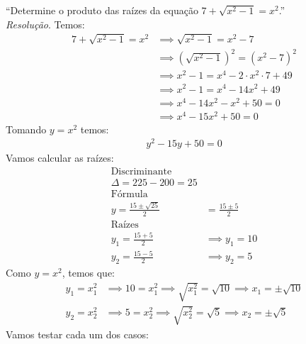 \enquote{Determine o produto das raízes da equação $7 + \sqrt{x^2 - 1} = x^2$.}
\\
\emph{Resolução}. Temos:
\begin{align*}
    7 + \sqrt{x^2 - 1} = x^2 & \implies \sqrt{x^2 - 1} = x^2 - 7 \\ & \implies
    (\sqrt{x^2 - 1})^2 = (x^2 - 7)^2 \\ & \implies
    x^2 - 1 = x^4 - 2\cdot x^2 \cdot 7 + 49 \\ & \implies 
    x^2 - 1 = x^4 - 14x^2 + 49 \\ & \implies
    x^4 - 14x^2 - x^2 + 50 = 0 \\ & \implies
    x^4 - 15x^2 + 50 = 0
\end{align*}
Tomando $y = x^2$ temos:
\begin{align*}
    y^2 - 15y + 50 = 0
\end{align*}
Vamos calcular as raízes:
\begin{align*}
    \text{Discriminante} \\
    \Delta = 225 - 200 = 25 
    \\ \text{Fórmula} \\
    y = \frac{15 \pm \sqrt{25}}{2} & =
    \frac{15 \pm 5}{2}
    \\ \text{Raízes} \\
    y_1 = \frac{15 + 5}{2} & \implies y_1 = 10 \\
    y_2 = \frac{15 - 5}{2} & \implies y_2 = 5
\end{align*}
Como $y = x^2$, temos que:
\begin{align*}
    y_1 = x_1^2 & \implies 10 = x_1^2 \implies \sqrt{x_1^2} = \sqrt{10} \implies x_1 = \pm \sqrt{10} \\ 
    y_2 = x_2^2 & \implies 5 = x_2^2 \implies \sqrt{x_2^2} = \sqrt{5} \implies x_2 = \pm \sqrt{5}
\end{align*}
Vamos testar cada um dos casos:
